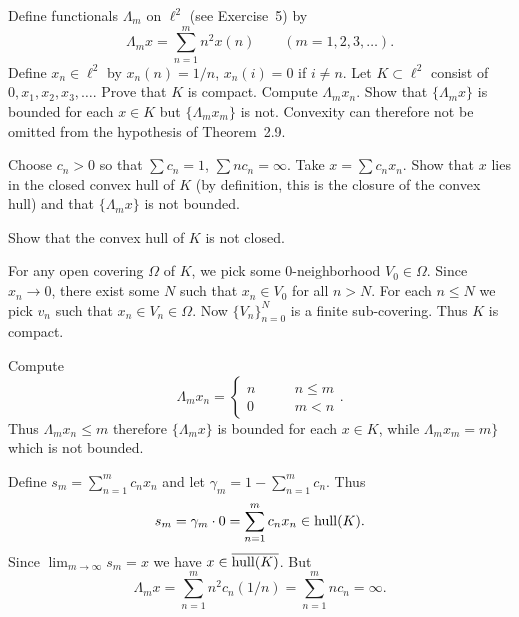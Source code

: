 \begin{enumerate}
\begin{excopy}
Define functionals \(\Lambda_m\) on \(\ell^2\) (see Exercise~5) by
\begin{equation*}
 \Lambda_m x = \sum_{n=1}^m n^2x(n) \qquad (m=1,2,3,\ldots).
\end{equation*}
Define \(x_n\in\ell^2\) by \(x_n(n) = 1/n\), \(x_n(i) = 0\) if \(i\neq n\).
Let \(K\subset \ell^2\) consist of \(0,x_1,x_2,x_3,\ldots\).
Prove that $K$ is compact.
Compute \(\Lambda_m x_n\).
Show that \(\{\Lambda_m x\}\) is bounded for each \(x\in K\)
but \(\{\Lambda_m x_m\}\) is not.
Convexity can therefore not be omitted from the hypothesis of Theorem~2.9.

Choose \(c_n > 0\) so that 
\(\sum c_n = 1\), 
\(\sum n c_n = \infty\).
Take \(x = \sum c_n  x_n\). Show that $x$ lies in the closed convex hull of $K$
(by definition, this is the closure of the convex hull)
and that \(\{\Lambda_m x\}\) is not bounded.

Show that the convex hull of $K$ is not closed.
\end{excopy}

For any open covering \(\Omega\) of $K$, we pick some $0$-neighborhood
\(V_0\in\Omega\). Since \(x_n \to 0\), there exist some $N$ such that
\(x_n\in V_0\) for all \(n>N\). For each \(n\leq N\) we pick \(v_n\)
such that \(x_n\in V_n\in\Omega\). Now \(\{V_n\}_{n=0}^N\)
is a finite sub-covering. Thus $K$ is compact.

Compute
\begin{equation*}
\Lambda_m x_n = \left\{%
 \begin{array}{ll}
   n & \qquad n \leq m \\
   0 & \qquad m < n
 \end{array}\right..
\end{equation*}
Thus \(\Lambda_m x_n \leq m\) 
therefore \(\{\Lambda_m x\}\) is bounded for each \(x\in K\),
while \(\Lambda_m x_m = m\}\) which is not bounded.

Define \(s_m = \sum_{n=1}^m c_n x_n\) and let 
\(\gamma_{m} = 1 - \sum_{n=1}^m c_n\).
Thus 
\begin{equation*}
s_m = \gamma_{m}\cdot 0 = \sum_{n=1}^m c_n x_n \in \mathop{\rm hull}\nolimits(K).
\end{equation*}
Since \(\lim_{m\to\infty} s_m = x\) we have \(x\in \overline{\mathop{\rm hull}\nolimits(K)}\).
But 
\begin{equation*}
\Lambda_m x 
= \sum_{n=1}^m n^2c_n(1/n)
= \sum_{n=1}^m n c_n = \infty.
\end{equation*}




\end{enumerate}
